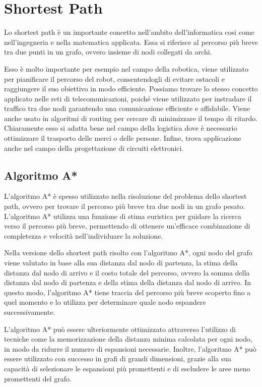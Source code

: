 \section{Shortest Path}\label{sec:cap_sec_subsec}
Lo shortest path è un importante concetto nell'ambito dell'informatica cosi come nell'ingegneria e nella matematica applicata. Essa si riferisce al percorso più
breve tra due punti in un grafo, ovvero insieme di nodi collegati da archi. 

Esso è molto importante per esempio nel campo della robotica, viene utilizzato per pianificare il percorso del robot, consentendogli di evitare ostacoli e
raggiungere il suo obiettivo in modo efficiente. Possiamo trovare lo stesso concetto applicato nelle reti di telecomunicazioni, poiché viene utilizzato per instradare
il traffico tra due nodi garantendo una comunicazione efficiente e affidabile. Viene anche usato in algoritmi di routing per cercare di minimizzare il tempo di ritardo.
Chiaramente esso si adatta bene nel campo della logistica dove è necessario ottimizzare il trasporto delle merci o delle persone. Infine, trova applicazione anche nel
campo della progettazione di circuiti elettronici.

\subsection{Algoritmo A*}\label{subsec:es_subsec}
L'algoritmo A* è spesso utilizzato nella risoluzione del problema dello shortest path, ovvero per trovare il percorso più breve tra due nodi in un grafo pesato. 
L'algoritmo A* utilizza una funzione di stima euristica per guidare la ricerca verso il percorso più breve, permettendo di ottenere un'efficace combinazione di completezza e velocità nell'individuare la soluzione.

Nella versione dello shortest path risolto con l'algoritmo A*, ogni nodo del grafo viene valutato in base alla sua distanza dal nodo di partenza, la stima della distanza dal nodo di arrivo e il costo totale del percorso, ovvero la somma della distanza dal nodo di partenza e della stima della distanza dal nodo di arrivo. In questo modo, l'algoritmo A* tiene traccia del percorso più breve scoperto fino a quel momento e lo utilizza per determinare quale nodo espandere successivamente.

L'algoritmo A* può essere ulteriormente ottimizzato attraverso l'utilizzo di tecniche come la memorizzazione della distanza minima calcolata per ogni nodo, in modo da ridurre il numero di espansioni necessarie. Inoltre, l'algoritmo A* può essere utilizzato con successo in grafi di grandi dimensioni, grazie alla sua capacità di selezionare le espansioni più promettenti e di escludere le aree meno promettenti del grafo.

